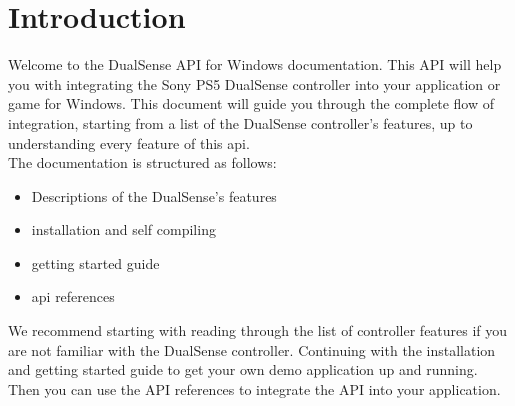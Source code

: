 \section{Introduction}
Welcome to the DualSense API for Windows documentation. This API will help you with integrating the Sony PS5 DualSense controller into your application or game for Windows. This document will guide you through the complete flow of integration, starting from a list of the DualSense controller's features, up to understanding every feature of this api.\\
The documentation is structured as follows:
\begin{itemize}
	\item Descriptions of the DualSense's features
	\item installation and self compiling
	\item getting started guide
	\item api references
\end{itemize}

We recommend starting with reading through the list of controller features if you are not familiar with the DualSense controller. Continuing with the installation and getting started guide to get your own demo application up and running. Then you can use the API references to integrate the API into your application.

\newpage